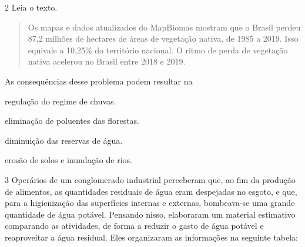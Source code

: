 \num{2} Leia o texto.

\begin{quote}
Os mapas e dados atualizados do MapBiomas mostram que o Brasil perdeu
87,2 milhões de hectares de áreas de vegetação nativa, de 1985 a 2019.
Isso equivale a 10,25\% do território nacional. O ritmo de perda de
vegetação nativa acelerou no Brasil entre 2018 e 2019.

\end{quote}

As consequências desse problema podem resultar na\bigskip

\begin{minipage}{.5\textwidth}
\begin{escolha}
\item regulação do regime de chuvas.

\item eliminação de poluentes das florestas.

\item diminuição das reservas de água.

\item erosão de solos e inundação de rios.
\end{escolha}
\end{minipage}

\pagebreak

\num{3} Operários de um conglomerado industrial perceberam que, ao
fim da produção de alimentos, as quantidades residuais de água eram
despejadas no esgoto, e que, para a higienização das superfícies
internas e externas, bombeava-se uma grande quantidade de água potável.
Pensando nisso, elaboraram um material estimativo comparando as
atividades, de forma a reduzir o gasto de água potável e reaproveitar a
água residual. Eles organizaram as informações na seguinte tabela:

